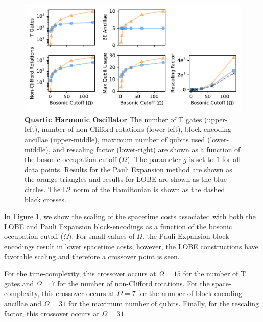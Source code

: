 \begin{figure}
    \label{fig:qosc}
    \includegraphics[width = 16cm]{figures/quartic_oscillator.pdf}
    \caption{
        \textbf{Quartic Harmonic Oscillator}
        The number of T gates (upper-left), number of non-Clifford rotations (lower-left), block-encoding ancillae (upper-middle), maximum number of qubits used (lower-middle), and rescaling factor (lower-right) are shown as a function of the bosonic occupation cutoff ($\Omega$).
        The parameter $g$ is set to $1$ for all data points.
        Results for the Pauli Expansion method are shown as the orange triangles and results for LOBE are shown as the blue circles.
        The L2 norm of the Hamiltonian is shown as the dashed black crosses.
    }
\end{figure}

In Figure \ref{fig:qosc}, we show the scaling of the spacetime costs associated with both the LOBE and Pauli Expansion block-encodings as a function of the bosonic occupation cutoff ($\Omega$).
For small values of $\Omega$, the Pauli Expansion block-encodings result in lower spacetime costs, however, the LOBE constructions have favorable scaling and therefore a crossover point is seen.

For the time-complexity, this crossover occurs at $\Omega = 15$ for the number of T gates and $\Omega = 7$ for the number of non-Clifford rotations.
For the space-complexity, this crossover occurs at $\Omega = 7$ for the number of block-encoding ancillae and $\Omega = 31$ for the maximum number of qubits.
Finally, for the rescaling factor, this crossover occurs at $\Omega = 31$.
